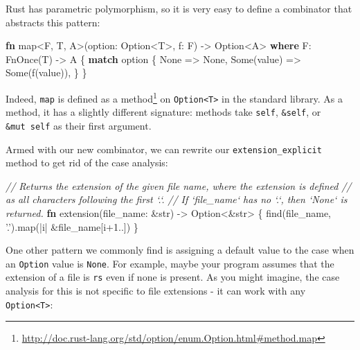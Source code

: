 \documentclass[a4paper,]{book}
\newenvironment{Shaded}{\begin{snugshade}}{\end{snugshade}}
\newcommand{\KeywordTok}[1]{\textcolor[rgb]{0.13,0.29,0.53}{\textbf{{#1}}}}
\newcommand{\DataTypeTok}[1]{\textcolor[rgb]{0.13,0.29,0.53}{{#1}}}
\newcommand{\DecValTok}[1]{\textcolor[rgb]{0.00,0.00,0.81}{{#1}}}
\newcommand{\ConstantTok}[1]{\textcolor[rgb]{0.00,0.00,0.00}{{#1}}}
\newcommand{\CharTok}[1]{\textcolor[rgb]{0.31,0.60,0.02}{{#1}}}
\newcommand{\CommentTok}[1]{\textcolor[rgb]{0.56,0.35,0.01}{\textit{{#1}}}}
\newcommand{\BuiltInTok}[1]{{#1}}
\newcommand{\NormalTok}[1]{{#1}}
\renewcommand{\href}[2]{#2\footnote{\url{#1}}}
\begin{document}
Rust has parametric polymorphism, so it is very easy to define a
combinator that abstracts this pattern:

\protect\hypertarget{code-option-map}{}{}

\begin{Shaded}
\begin{Highlighting}[]
\KeywordTok{fn} \NormalTok{map<F, T, A>(option: }\DataTypeTok{Option}\NormalTok{<T>, f: F) -> }\DataTypeTok{Option}\NormalTok{<A> }\KeywordTok{where} \NormalTok{F: }\BuiltInTok{FnOnce}\NormalTok{(T) -> A \{}
    \KeywordTok{match} \NormalTok{option \{}
        \ConstantTok{None} \NormalTok{=> }\ConstantTok{None}\NormalTok{,}
        \ConstantTok{Some}\NormalTok{(value) => }\ConstantTok{Some}\NormalTok{(f(value)),}
    \NormalTok{\}}
\NormalTok{\}}
\end{Highlighting}
\end{Shaded}

Indeed, \texttt{map} is
\href{http://doc.rust-lang.org/std/option/enum.Option.html\#method.map}{defined
as a method} on \texttt{Option\textless{}T\textgreater{}} in the
standard library. As a method, it has a slightly different signature:
methods take \texttt{self}, \texttt{\&self}, or \texttt{\&mut\ self} as
their first argument.

Armed with our new combinator, we can rewrite our
\texttt{extension\_explicit} method to get rid of the case analysis:

\begin{Shaded}
\begin{Highlighting}[]
\CommentTok{// Returns the extension of the given file name, where the extension is defined}
\CommentTok{// as all characters following the first `.`.}
\CommentTok{// If `file_name` has no `.`, then `None` is returned.}
\KeywordTok{fn} \NormalTok{extension(file_name: &}\DataTypeTok{str}\NormalTok{) -> }\DataTypeTok{Option}\NormalTok{<&}\DataTypeTok{str}\NormalTok{> \{}
    \NormalTok{find(file_name, }\CharTok{'.'}\NormalTok{).map(|i| &file_name[i+}\DecValTok{1.}\NormalTok{.])}
\NormalTok{\}}
\end{Highlighting}
\end{Shaded}

One other pattern we commonly find is assigning a default value to the
case when an \texttt{Option} value is \texttt{None}. For example, maybe
your program assumes that the extension of a file is \texttt{rs} even if
none is present. As you might imagine, the case analysis for this is not
specific to file extensions - it can work with any
\texttt{Option\textless{}T\textgreater{}}:
\end{document}

